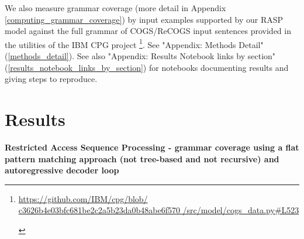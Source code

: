 \documentclass[11pt]{article}
\begin{document}
We also measure grammar coverage \cite{fuzzingbook2023:GrammarCoverageFuzzer} (more detail in Appendix \ref{computing_grammar_coverage}) by input examples supported by our RASP model against the full grammar of COGS/ReCOGS input sentences provided in the utilities of the IBM CPG project \cite{klinger2024compositionalprogramgenerationfewshot}\footnote{\begin{footnotesize}\href{https://github.com/IBM/cpg/blob/c3626b4e03bfc681be2c2a5b23da0b48abe6f570/src/model/cogs_data.py\#L523}{https://github.com/IBM/cpg/blob/
c3626b4e03bfc681be2c2a5b23da0b48abe6f570
/src/model/cogs\_data.py\#L523}
\end{footnotesize}}. See "Appendix: Methods Detail" (\ref{methods_detail}). See also "Appendix: Results Notebook links by section" (\ref{results_notebook_links_by_section}) for notebooks documenting results and giving steps to reproduce.
\section{Results}
\textbf{Restricted Access Sequence Processing - grammar coverage using a flat pattern matching approach (not tree-based and not recursive) and autoregressive decoder loop}
\end{document}
